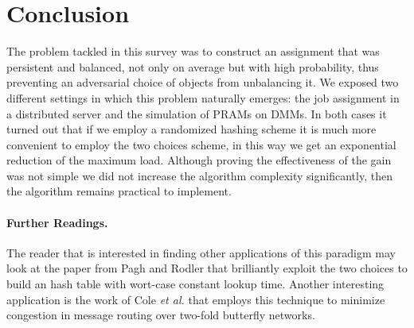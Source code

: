 \section{Conclusion}

The problem tackled in this survey was to construct an assignment that was
persistent and balanced, not only
on average but with high probability, thus preventing an adversarial choice of
objects from unbalancing it.
We exposed two different settings in which
this problem naturally emerges: the job assignment in a distributed server and
the simulation of PRAMs on DMMs. In both cases it turned out that if we
employ a randomized hashing scheme it is much more convenient to employ
the two choices scheme, in this way we get an exponential reduction of the
maximum load. Although proving the effectiveness of the gain was not simple
we did not increase the algorithm complexity significantly, then the algorithm
remains practical to implement.

\paragraph{Further Readings.} The reader that is interested in finding
other applications of this paradigm may look at the paper from
Pagh and Rodler \cite{Pagh} that brilliantly exploit the two
choices to build an hash table with wort-case constant lookup time. Another
interesting application is the work of Cole {\em et al.} \cite{Cole} that employs
this technique to minimize congestion in message routing over two-fold butterfly
networks.


